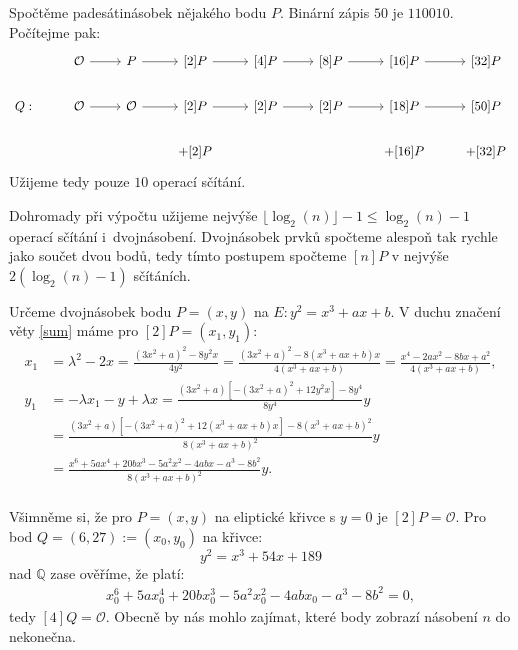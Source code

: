 \documentclass[12pt]{report}
\begin{document}
\begin{priklad}
Spočtěme padesátinásobek nějakého bodu $P$. Binární zápis $50$ je $110010$. Počítejme pak:
\begin{equation*}
\begin{tikzcd}[arrows=to]
& \mathcal{O} \rar & P \rar & {[2]}P \rar & {[4]}P \rar & {[8]}P \rar & {[16]}P \rar & {[32]} P   \\
Q: &   \mathcal{O} \rar & \mathcal{O} \rar & {[2]}P \rar & {[2]}P \rar & {[2]}P \rar & {[18]}P \rar & {[50]} P   \\
 &  &  & + {[2]}P  & & & + {[16]}P  & +{[32]}P 
    \end{tikzcd} 
\end{equation*}
Užijeme tedy pouze $10$ operací sčítání.
\end{priklad}
 

Dohromady při výpočtu užijeme nejvýše $\lfloor \log_2(n) \rfloor -1 \leqslant \log_2(n)-1$ operací sčítání i~dvojnásobení. Dvojnásobek prvků spočteme alespoň tak rychle jako součet dvou bodů, tedy tímto postupem spočteme $[n]P$ v nejvýše $2( \log_2(n)-1)$ sčítáních.

\begin{priklad}\label{priklad2}
Určeme dvojnásobek bodu $P = (x,y)$ na $E : y^2 = x^3 + ax + b$. V duchu značení věty \ref{sum} máme pro $[2] P = (x_1,y_1)$:
\begin{align*}
x_1 &= \lambda^2 - 2x = \frac{(3x ^2 + a)^2 - 8 y^2 x }{4 y ^2} = \frac{(3x ^2 + a)^2 - 8 (x^3+ax+b) x }{4 (x^3+ax+b)} = \frac{x^4-2a x^2 - 8bx + a^2}{4 (x^3+ax+b)},\\
y_1 &=  - \lambda x_1 - y + \lambda x = \frac{(3x^2 + a)[-(3x ^2 + a)^2 + 12 y^2 x] - 8y^4}{8y^4} y \\
&=  \frac{(3x^2 + a)[-(3x ^2 + a)^2 + 12 (x^3 + ax + b) x] - 8 (x^3 + ax + b)^2}{8(x^3 + ax + b)^2} y\\
&= \frac{x^6 + 5 a x^4 + 20 b x^3 - 5 a^2 x^2 - 4ab x - a^3 - 8 b^2}{8(x^3 + ax + b)^2} y.  \\
\end{align*}
\end{priklad}


Všimněme si, že pro $P = (x,y)$ na eliptické křivce s $y=0$ je $[2] P = \mathcal{O}$. Pro bod $Q = (6,27) := (x_0,y_0)$ na křivce:
\begin{equation*}
y^2 = x^3 +54x+189
\end{equation*}
nad $\mathbb{Q}$ zase ověříme, že platí:
\begin{align*}
x_0^6 + 5 a x_0^4 + 20 b x_0^3 - 5 a^2 x_0^2 - 4ab x_0 - a^3 - 8 b^2 = 0,
\end{align*}
tedy $[4]Q = \mathcal{O}$. Obecně by nás mohlo zajímat, které body zobrazí násobení $n$ do nekonečna.
\end{document}
